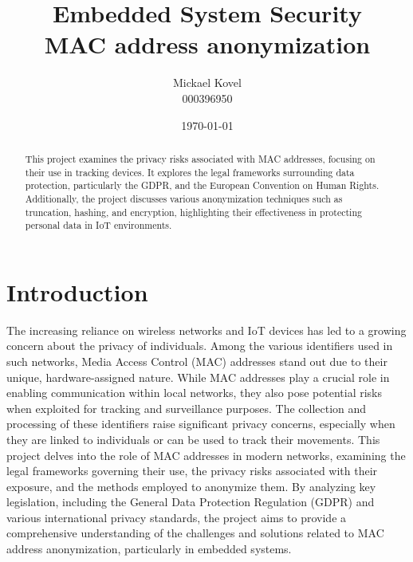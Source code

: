 \documentclass{article}
\begin{document}
\begin{figure}[t]
	\label{fig:ulbLogo}
\end{figure}
\author {Mickael Kovel\\000396950}
\date{\today}
\title{Embedded System Security \\ MAC address anonymization}
\maketitle
\begin{abstract}
This project examines the privacy risks associated with MAC addresses, focusing
on their use in tracking devices. It explores the legal frameworks surrounding 
data protection, particularly the GDPR, and the European Convention on Human Rights. 
Additionally, the project discusses various anonymization techniques such as truncation,
hashing, and encryption, highlighting their effectiveness in protecting personal data in
IoT environments.
\newpage
\end{abstract}
\tableofcontents
\newpage


\section{\label{sec:Intro}Introduction}

The increasing reliance on wireless networks and IoT devices has led to a 
growing concern about the privacy of individuals. Among the various identifiers 
used in such networks, Media Access Control (MAC) addresses stand out due to their 
unique, hardware-assigned nature. While MAC addresses play a crucial role in enabling 
communication within local networks, they also pose potential risks when exploited for 
tracking and surveillance purposes. The collection and processing of these identifiers 
raise significant privacy concerns, especially when they are linked to individuals or 
can be used to track their movements. This project delves into the role of MAC addresses 
in modern networks, examining the legal frameworks governing their use, the privacy risks
associated with their exposure, and the methods employed to anonymize them. By analyzing 
key legislation, including the General Data Protection Regulation (GDPR) and various 
international privacy standards, the project aims to provide a comprehensive understanding 
of the challenges and solutions related to MAC address anonymization, particularly in 
embedded systems.
\end{document}
